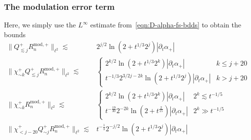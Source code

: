 \documentclass[letterpaper, reqno,final]{amsart}
\begin{document}
\subsubsection{The modulation error term}
Here, we simply use the $L^\infty$ estimate from~\eqref{eqn:D-alpha-fs-bdds} to obtain the bounds
\begin{equation}\label{eqn:R_n-mod-ests}\begin{split}
    \lVert Q_{\lesssim j}^+ R_n^{\text{mod},+} \rVert_{\ell^2} \lesssim& 2^{j/2} \ln(2 + t^{1/3} 2^{j}) |\partial_t \alpha_+|\\
    \lVert \chi_{\sim k}^+ Q_{\lesssim j}^+ R_n^{\text{mod},+} \rVert_{\ell^2} \lesssim&\begin{cases}
        2^{k/2} \ln(2 + t^{1/3} 2^{k}) |\partial_t \alpha_+| & k \leq j + 20\\
        t^{-1/3} 2^{3/2j - 2k}\ln(2 + t^{1/3} 2^{j}) |\partial_t \alpha_+| & k > j + 20
    \end{cases}\\
    \lVert \chi_{\sim k}^+ R_n^{\text{mod},+} \rVert_{\ell^2} \lesssim&\begin{cases}
        2^{k/2} \ln(2 + t^{1/3} 2^{k}) |\partial_t \alpha_+| & 2^k \lesssim t^{-1/5}\\
        t^{-\frac{19}{30}} 2^{- 2k}\ln(2 + t^{\frac{2}{15}}) |\partial_t \alpha_+| & 2^k \gg t^{-1/5}
    \end{cases}\\
    \lVert \chi_{< j - 20}^+ Q_{\sim j}^+ R_n^{\text{mod},+} \rVert_{\ell^2} \lesssim& t^{-\frac{1}{3}} 2^{-j/2} \ln(2 + t^{1/3} 2^{j})|\partial_t \alpha_+|
\end{split}\end{equation}
\end{document}
